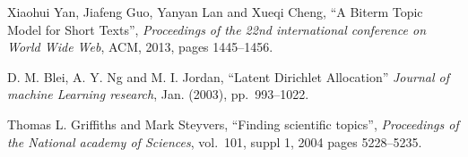 \documentclass[final]{ieee}
\begin{document}
\begin{thebibliography}{99}
   Xiaohui Yan, Jiafeng Guo, Yanyan Lan and Xueqi Cheng, 
   ``A Biterm Topic Model for Short Texts'', {\it Proceedings of the 22nd international conference on 
   World Wide Web}, ACM, 2013, pages 1445--1456.

   D. M. Blei, A. Y. Ng and M. I. Jordan, ``Latent Dirichlet Allocation'' {\it Journal of machine Learning research},  Jan. (2003), pp.~993--1022.
   
    Thomas L. Griffiths and Mark Steyvers, 
   ``Finding scientific topics'', {\it Proceedings of the National academy of Sciences}, vol.~101, suppl 1, 2004 pages 5228--5235.


  
    
  
  







\end{thebibliography}
\end{document}
